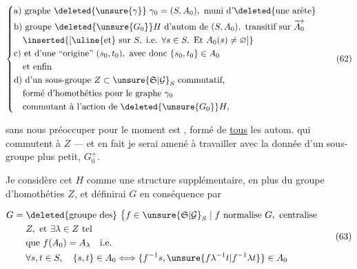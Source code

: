 \[
\left\{\begin{aligned}
&\text{a) graphe }\deleted{\unsure{\gamma}}\ \gamma_0=(S,A_0),\text{ muni d'\deleted{une arête}}\\
&\text{b) groupe }\deleted{\unsure{G_0}}H\text{ d'autom de }(S,A_0),\text{ transitif sur }\overrightarrow{A_0}\\
&\quad\inserted{[\text{\uline{et} sur }S,\ \text{i.e. }\forall s\in S,\ \mathrm{Et}\ A_0(s)\ne\varnothing]}\\
&\text{c) et d'une \textquotedblleft{}origine\textquotedblright{} }(s_0,t_0),\text{ avec donc }\{s_0,t_0\}\in A_0\\
&\quad\text{et enfin}\\
&\text{d) d'un sous-groupe } Z\subset\unsure{\mathfrak S|\mathcal G}_S\text{ commutatif,}\\
&\quad\text{formé d'homothéties pour le graphe }\gamma_0\\
&\quad\text{commutant à l'action de }\deleted{\unsure{G_0}}H,
\end{aligned}\right.
\tag*{(62)}
\]

sans nous préoccuper pour le moment   est , formé de \uline{tous} les autom.   qui commutent à $Z$ --- et en fait je serai amené à travailler avec la donnée d'un sous-groupe  plus petit, $G_0^{+}$. 



Je considère cet $H$ comme une structure supplémentaire, en plus du  groupe d'homothéties $Z$, et définirai $G$ en conséquence par

\[
\begin{aligned}
G={}&\deleted{\text{groupe des}}\ \bigl\{f\in\unsure{\mathfrak S|\mathcal G}_S\mid f\text{ normalise }G,\text{ centralise}\\
& Z,\ \text{et }\exists\lambda\in Z\text{ tel}\\
&\text{que } f(A_0)=A_\lambda\quad\text{i.e.}\\
&\forall s,t\in S,\quad\{s,t\}\in A_0\Longleftrightarrow\{f^{-1}s,\unsure{f\lambda^{-1}t|f^{-1}\lambda t}\}\in A_0
\end{aligned}
\tag*{(63)}
\]

